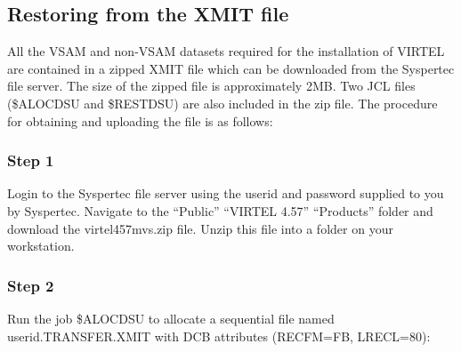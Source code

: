 \documentclass[letterpaper,10pt,english]{sphinxmanual}
\begin{document}

\subsection{Restoring from the XMIT file}
\label{\detokenize{Installation_Guide:index-4}}\label{\detokenize{Installation_Guide:restoring-from-the-xmit-file}}
All the VSAM and non-VSAM datasets required for the installation of VIRTEL are contained in a zipped XMIT file which can be downloaded from the Syspertec file server. The size of the zipped file is approximately 2MB. Two JCL files (\$ALOCDSU and \$RESTDSU) are also     included in the zip file. The procedure for obtaining and uploading the file is as follows:


\subsubsection{Step 1}
\label{\detokenize{Installation_Guide:step-1}}
Login to the Syspertec file server  using the userid and password supplied to you by Syspertec. Navigate to the “Public” \textendash{} “VIRTEL 4.57” \textendash{} “Products” folder and download the virtel457mvs.zip file. Unzip this file into a folder on your workstation.


\subsubsection{Step 2}
\label{\detokenize{Installation_Guide:step-2}}
Run the job \$ALOCDSU to allocate a sequential file named userid.TRANSFER.XMIT with DCB attributes (RECFM=FB, LRECL=80):
\end{document}

